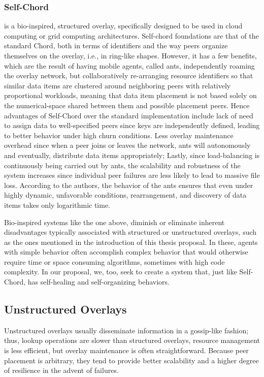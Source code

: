 \documentclass[runningheads]{llncs}
\begin{document}
\subsubsection{Self-Chord} \cite{selfchord} is a bio-inspired, structured overlay, specifically designed to be used in cloud computing or grid computing architectures. Self-chord foundations are that of the standard Chord, both in terms of identifiers and the way peers organize themselves on the overlay, i.e., in ring-like shapes. However, it has a few benefits, which are the result of having mobile agents, called ants, independently roaming the overlay network, but collaboratively re-arranging resource identifiers so that similar data items are clustered around neighboring peers with relatively proportional workloads, meaning that data item placement is not based solely on the numerical-space shared between them and possible placement peers. Hence advantages of Self-Chord over the standard implementation include lack of need to assign data to well-specified peers since keys are independently defined, leading to better behavior under high churn conditions. Less overlay maintenance overhead since when a peer joins or leaves the network, ants will autonomously and eventually, distribute data items appropriately; Lastly, since load-balancing is continuously being carried out by ants, the scalability and robustness of the system increases since individual peer failures are less likely to lead to massive file loss. According to the authors, the behavior of the ants ensures that even under highly dynamic, unfavorable conditions, rearrangement, and discovery of data items takes only logarithmic time.

Bio-inspired systems like the one above, diminish or eliminate inherent disadvantages typically associated with structured or unstructured overlays, such as the ones mentioned in the introduction of this thesis proposal. In these, agents with simple behavior often accomplish complex behavior that would otherwise require time or space consuming algorithms, sometimes with high code complexity. In our proposal, we, too, seek to create a system that, just like Self-Chord, has self-healing and self-organizing behaviors.

\subsection{Unstructured Overlays}
Unstructured overlays usually disseminate information in a gossip-like fashion; thus, lookup operations are slower than structured overlays, resource management is less efficient, but overlay maintenance is often straightforward. Because peer placement is arbitrary, they tend to provide better scalability and a higher degree of resilience in the advent of failures.
\end{document}
